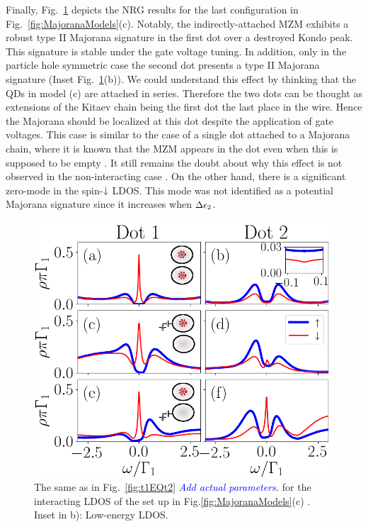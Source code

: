 \documentclass[showpacs,aps,prb,reprint,superscriptaddress]{revtex4-1}
\newcommand{\LUIS}[1]{\textcolor{blue}{\fbox{Luis} {\sl#1}}}
\begin{document}
   Finally, Fig.\ \ref{fig:Nt2>0} depicts the NRG results for the last configuration in Fig.\ \ref{fig:MajoranaModels}(c). Notably, the indirectly-attached MZM exhibits a robust type II Majorana signature in the first dot over a destroyed Kondo peak. This signature is stable under the gate voltage tuning. In addition, only  in the particle hole symmetric case the second dot presents a type II Majorana signature (Inset Fig.\ \ref{fig:Nt2>0}(b)). We could understand this effect by thinking that the QDs in model (c) are attached in series. Therefore the two dots can be thought as extensions of the Kitaev chain being the first dot  the last place in the wire. Hence the Majorana should be localized at this dot despite the application of gate voltages. This case is similar to the case of a single dot attached to a Majorana chain, where it is known that the MZM appears in the dot even when this is supposed to be empty \cite{vernek_subtle_2014}. It still remains the doubt about why this effect is not observed in the non-interacting case . On the other hand, there is a significant zero-mode in the spin-$\downarrow$ LDOS. This mode was not identified as a potential Majorana signature since it increases when $\Delta \epsilon_2$. 


    
\begin{figure}[bt]
\begin{center}
\includegraphics[scale=0.45]{Graficos/b_Nt2gt0.png}
\caption{  \label{fig:Nt2>0} The same as in Fig.\ \ref{fig:t1EQt2} \LUIS{Add actual parameters.} for the interacting LDOS of the set up in Fig.\ref{fig:MajoranaModels}(c) . Inset in b): Low-energy LDOS. 
}
%

\end{center}
\end{figure}
\end{document}
